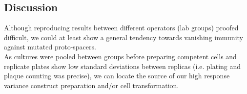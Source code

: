 \documentclass[a4paper,10pt]{article}
\begin{document}
\subsection{Discussion}

Although reproducing results between different operators (lab groups) proofed difficult, we could at least show a general tendency towards vanishing immunity against mutated proto-spacers. 
\\As cultures were pooled between groups before preparing competent cells and replicate plates show low standard deviations between replicas (i.e. plating and plaque counting was precise), we can locate the source of our high response variance construct preparation and/or cell transformation. 
\end{document}
